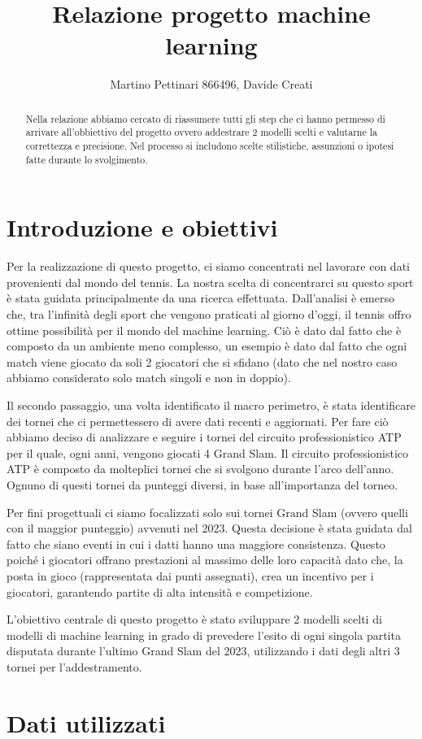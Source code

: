 \documentclass[letterpaper,12pt]{article}
\begin{document}
\title{Relazione progetto machine learning}
\author{Martino Pettinari 866496, Davide Creati}
\maketitle

\begin{abstract}
Nella relazione abbiamo cercato di riassumere tutti gli step che ci hanno permesso di arrivare all'obbiettivo del progetto ovvero addestrare 2 modelli scelti e valutarne la correttezza e precisione. Nel processo si includono scelte stilistiche, assunzioni o ipotesi fatte durante lo svolgimento.
\end{abstract}


\section{Introduzione e obiettivi}

Per la realizzazione di questo progetto, ci siamo concentrati nel lavorare con dati provenienti dal mondo del tennis. La nostra scelta di concentrarci su questo sport è stata guidata principalmente da una ricerca effettuata. Dall'analisi è emerso che, tra l'infinità degli sport che vengono praticati al giorno d'oggi, il tennis offro ottime possibilità per il mondo del machine learning. Ciò è dato dal fatto che è composto da un ambiente meno complesso, un esempio è dato dal fatto che ogni match viene giocato da soli 2 giocatori che si sfidano (dato che nel nostro caso abbiamo considerato solo match singoli e non in doppio). 

Il secondo passaggio, una volta identificato il macro perimetro, è stata identificare dei tornei che ci permettessero di avere dati recenti e aggiornati. Per fare ciò abbiamo deciso di analizzare e seguire i tornei del circuito professionistico ATP per il quale, ogni anni, vengono giocati 4 Grand Slam. Il circuito professionistico ATP è composto da molteplici tornei che si svolgono durante l'arco dell'anno. Ognuno di questi tornei da punteggi diversi, in base all'importanza del torneo. 

Per fini progettuali ci siamo focalizzati solo sui tornei Grand Slam (ovvero quelli con il maggior punteggio) avvenuti nel 2023. Questa decisione è stata guidata dal fatto che siano eventi in cui i datti hanno una maggiore consistenza. Questo poiché i giocatori offrano prestazioni al massimo delle loro capacità dato che, la posta in gioco (rappresentata dai punti assegnati), crea un incentivo per i giocatori, garantendo partite di alta intensità e competizione. 

L'obiettivo centrale di questo progetto è stato sviluppare 2 modelli scelti di modelli di machine learning in grado di prevedere l'esito di ogni singola partita disputata durante l'ultimo Grand Slam del 2023, utilizzando i dati degli altri 3 tornei per l'addestramento. 

\section{Dati utilizzati}
\end{document}
